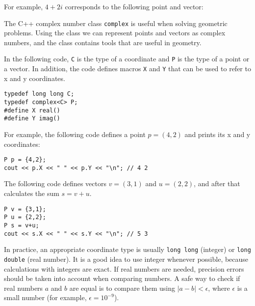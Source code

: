 For example, $4+2i$ corresponds to the
following point and vector:

\begin{center}
\end{center}


The C++ complex number class \texttt{complex} is
useful when solving geometric problems.
Using the class we can represent points and vectors
as complex numbers, and the class contains tools
that are useful in geometry.

In the following code, \texttt{C} is the type of
a coordinate and \texttt{P} is the type of a point or a vector.
In addition, the code defines macros \texttt{X} and \texttt{Y}
that can be used to refer to x and y coordinates.

\begin{lstlisting}
typedef long long C;
typedef complex<C> P;
#define X real()
#define Y imag()
\end{lstlisting}

For example, the following code defines a point $p=(4,2)$
and prints its x and y coordinates:

\begin{lstlisting}
P p = {4,2};
cout << p.X << " " << p.Y << "\n"; // 4 2
\end{lstlisting}

The following code defines vectors $v=(3,1)$ and $u=(2,2)$,
and after that calculates the sum $s=v+u$.

\begin{lstlisting}
P v = {3,1};
P u = {2,2};
P s = v+u;
cout << s.X << " " << s.Y << "\n"; // 5 3
\end{lstlisting}

In practice,
an appropriate coordinate type is usually
\texttt{long long} (integer) or \texttt{long double}
(real number).
It is a good idea to use integer whenever possible,
because calculations with integers are exact.
If real numbers are needed,
precision errors should be taken into account
when comparing numbers.
A safe way to check if real numbers $a$ and $b$ are equal
is to compare them using $|a-b|<\epsilon$,
where $\epsilon$ is a small number (for example, $\epsilon=10^{-9}$).

